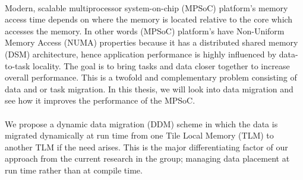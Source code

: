 \documentclass{listhesis}
\begin{document}
\\
Modern, scalable multiprocessor system-on-chip (MPSoC) platform's memory access time depends on where the memory is located relative to the core which accesses the memory. In other words (MPSoC) platform's have Non-Uniform Memory Access (NUMA) properties because it has a distributed shared memory (DSM) architecture, hence application performance is highly influenced by data-to-task locality. The goal is to bring tasks and data closer together to increase overall performance. This is a twofold and complementary problem consisting of data and or task migration. In this thesis, we will look into data migration and see how it improves the performance of the MPSoC.\\
\\
We propose a dynamic data migration (DDM) scheme in which the data is migrated dynamically at run time from one Tile Local Memory (TLM) to another TLM if the need arises. This is the major differentiating factor of our approach from the current research in the group; managing data placement at run time rather than at compile time.
\end{document}
